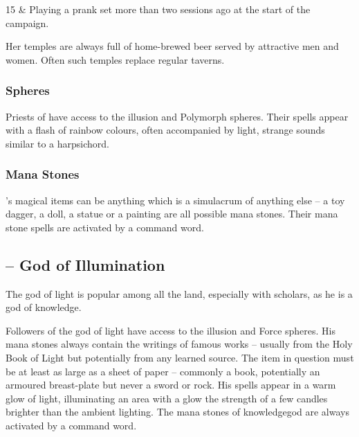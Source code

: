 \begin{multicols}{2}
\begin{xpchart}{}
	15 & Playing a prank set more than two sessions ago at the start of the campaign. \\

\end{xpchart}

Her temples are always full of home-brewed beer served by attractive men and women. Often such temples replace regular taverns.

\subsubsection{Spheres}

\noindent Priests of  have access to the illusion and Polymorph spheres.
Their spells appear with a flash of rainbow colours, often accompanied by light, strange sounds similar to a harpsichord.

\subsubsection{Mana Stones}

's magical items can be anything which is a simulacrum of anything else -- a toy dagger, a doll, a statue or a painting are all possible mana stones.
Their mana stone spells are activated by a command word.

\subsection{ -- God of Illumination}

\noindent The god of light is popular among all the land, especially with scholars, as he is a god of knowledge.

Followers of the god of light have access to the illusion and Force spheres.
His mana stones always contain the writings of famous works -- usually from the Holy Book of Light but potentially from any learned source.
The item in question must be at least as large as a sheet of paper -- commonly a book, potentially an armoured breast-plate but never a sword or rock.
His spells appear in a warm glow of light, illuminating an area with a glow the strength of a few candles brighter than the ambient lighting.
The mana stones of \Gls{knowledgegod} are always activated by a command word.

\begin{xpchart}{}


\end{xpchart}
\end{multicols}
